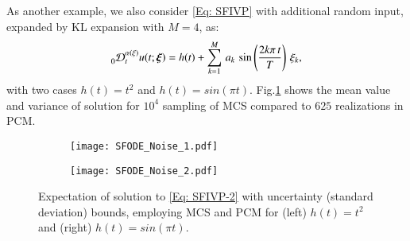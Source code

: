 As another example, we also consider \eqref{Eq: SFIVP} with additional random input, expanded by KL expansion with $M=4$, as:
%
\begin{equation}
%
\label{Eq: SFIVP-2}
\prescript{}{0}{\mathcal{D}}_{t}^{\alpha(\xi)}  u(t;\boldsymbol{\xi}) = h(t) +  \sum_{k=1}^M \, a_k \, \sin\left(\frac{2 k \pi \, t}{T}\right) \, \xi_k,
%
\end{equation}
%
with two cases $h(t) = t^2$ and $h(t) = sin(\pi t)$. Fig.\ref{Fig: MCM PCM SFIVP-2} shows the mean value and variance of solution for $10^4$ sampling of MCS compared to $625$ realizations in PCM.
%
%
\begin{figure}[t]
	\centering
	\begin{subfigure}{0.45\textwidth}
		\centering
		\texttt{[image: SFODE\_Noise\_1.pdf]}
	\end{subfigure}
	\begin{subfigure}{0.45\textwidth}
		\centering
		\texttt{[image: SFODE\_Noise\_2.pdf]}
	\end{subfigure}
	\caption{Expectation of solution to \eqref{Eq: SFIVP-2} with uncertainty (standard deviation) bounds, employing MCS and PCM for (left) $h(t) = t^2$ and (right) $h(t) = sin(\pi t)$. }
	\label{Fig: MCM PCM SFIVP-2}
\end{figure}
%
%



